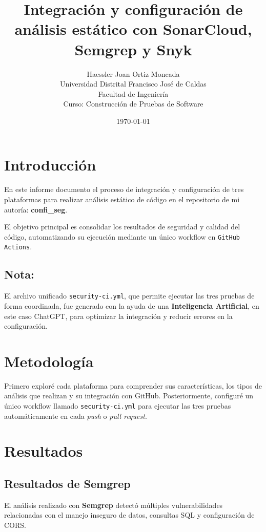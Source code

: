 \documentclass[12pt, a4paper]{article}
\title{\textbf{Integración y configuración de análisis estático con SonarCloud, Semgrep y Snyk}}
\author{Haessler Joan Ortiz Moncada \\[0.5cm]
        Universidad Distrital Francisco José de Caldas \\
        Facultad de Ingeniería \\
        Curso: Construcción de Pruebas de Software}
\date{\today}
\begin{document}
\maketitle

\section{Introducción}

En este informe documento el proceso de integración y configuración de tres plataformas para realizar 
análisis estático de código en el repositorio de mi autoría: \textbf{confi\_seg}.  

El objetivo principal es consolidar los resultados de seguridad y calidad del código, 
automatizando su ejecución mediante un único workflow en \texttt{GitHub Actions}.  

\subsection*{Nota:}
El archivo unificado \texttt{security-ci.yml}, que permite ejecutar las tres pruebas de forma coordinada, 
fue generado con la ayuda de una \textbf{Inteligencia Artificial}, en este caso ChatGPT, 
para optimizar la integración y reducir errores en la configuración.

\section{Metodología}
Primero exploré cada plataforma para comprender sus características, los tipos de análisis que realizan y su 
integración con GitHub. Posteriormente, configuré un único workflow llamado \texttt{security-ci.yml} para ejecutar 
las tres pruebas automáticamente en cada \textit{push} o \textit{pull request}.

\section{Resultados}

\subsection{Resultados de Semgrep}
El análisis realizado con \textbf{Semgrep} detectó múltiples vulnerabilidades relacionadas con el manejo inseguro de 
datos, consultas SQL y configuración de CORS.
\end{document}
